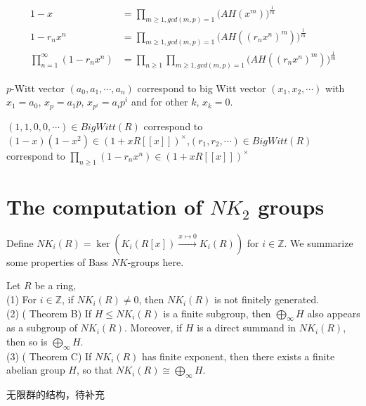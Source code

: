 \begin{align*}
1-x & = \prod_{m\geq 1,gcd(m,p)=1}\big(AH(x^m)\big)^{\frac{1}{m}}\\
1-r_nx^n & = \prod_{m\geq 1,gcd(m,p)=1}\big(AH((r_nx^n)^m)\big)^{\frac{1}{m}}\\
\prod_{n=1}^{\infty}(1-r_nx^n) & = \prod_{n\geq 1}\prod_{m\geq 1,gcd(m,p)=1}\big(AH((r_nx^n)^m)\big)^{\frac{1}{m}}
\end{align*}

$p$-Witt vector $(a_0,a_1,\cdots,a_n)$ correspond to big Witt vector $(x_1,x_2,\cdots)$ with $x_1=a_0$, $x_p=a_1p$, $x_{p^i}=a_ip^i$ and for other $k$, $x_k =0$. 

$(1,1,0,0,\cdots)\in BigWitt(R)$ correspond to $(1-x)(1-x^2)\in (1+xR[[x]])^{\times}$,$(r_1,r_2,\cdots)\in BigWitt(R)$ correspond to $\prod_{n\geq 1}(1-r_nx^n)\in (1+xR[[x]])^{\times}$







\section{The computation of $NK_2$ groups}
Define $NK_i(R)=\ker(K_i(R[x])\overset{x\mapsto 0}\longrightarrow K_i(R))$ for $i\in \mathbb{Z}$.
We summarize some properties of Bass $NK$-groups here.
\begin{prop}
\label{prop:nkproperty}
	Let $R$ be a ring,\\
	(1) For $i\in \mathbb{Z}$, if $NK_i(R)\neq 0$, then $NK_i(R)$ is not finitely generated.\\
	(2) (\cite{Lafont2014Revisiting} Theorem B) If $H \leq NK_i(R)$ is a finite subgroup, then $\bigoplus_{\infty} H$ also appears as a subgroup of $NK_i(R)$. Moreover, if $H$ is a direct summand in $NK_i(R)$, then so is $\bigoplus_{\infty} H$.\\
	(3) (\cite{Lafont2014Revisiting} Theorem C) If $NK_i(R)$ has finite exponent, then there exists a finite abelian group $H$, so that $NK_i(R) \cong \bigoplus_{\infty} H$.
\end{prop}
\begin{lemma}
	无限群的结构，待补充
\end{lemma}


